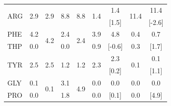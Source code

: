 \begin{table}
\begin{tabular}{l|cccc|cccc}
\hline
\multirow{2}{*}{ARG} & \multirow{2}{*}{2.9} & \multirow{2}{*}{2.9}   & \multirow{2}{*}{8.8} & \multirow{2}{*}{8.8}    & \multirow{2}{*}{1.4} & 1.4                    & \multirow{2}{*}{11.4}  & 11.4 \\
                     &                      &                         &                      &                        &                      & [1.5]                  &                        & [-2.6]   \\
\hline
PHE                  & 4.2                  & \multirow{2}{*}{4.2}   & 2.4                  & \multirow{2}{*}{2.4}    &  3.9                 & 4.8                    & 0.4 & 0.7 \\
THP                  & 0.0                  &                        & 0.0                  &                         &  0.9                 & [-0.6]                 & 0.3 & [1.7]               \\
\hline
\multirow{2}{*}{TYR} & \multirow{2}{*}{2.5} & \multirow{2}{*}{2.5}   & \multirow{2}{*}{1.2} & \multirow{2}{*}{1.2}   & \multirow{2}{*}{2.3}  & 2.3                     & \multirow{2}{*}{0.1} & 0.1\\
                     &                      &                        &                      &                         &                      &  [0.2]                  &                      & [1.1]   \\
\hline
GLY                  & 0.1                  & \multirow{2}{*}{0.1}   & 3.1                  & \multirow{2}{*}{4.9}    &   0.0                &  0.0                    & 0.0 & 0.0 \\
PRO                  & 0.0                  &                        & 1.8                  &                         &   0.0                &  [0.1]                  & 0.0 & [4.9]\\
\hline

\end{tabular} 
\end{table}

